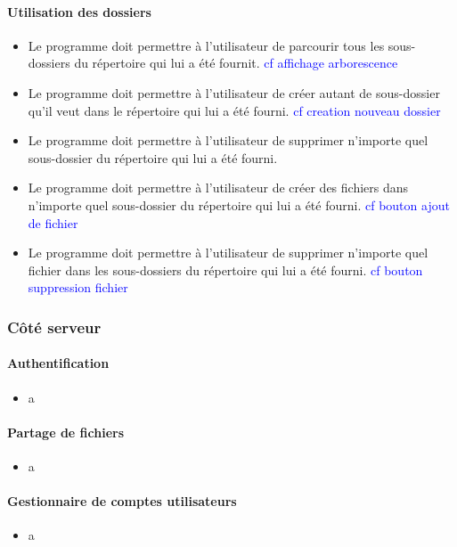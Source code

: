 \documentclass[10pt,a4paper]{report}
\begin{document}
\paragraph{Utilisation des dossiers}
	\begin{itemize}[label = $\triangleright$]
		\item Le programme doit permettre à l'utilisateur de parcourir tous les sous-dossiers du répertoire qui lui a été fournit. \textcolor{blue}{cf affichage arborescence}
		\item Le programme doit permettre à l'utilisateur de créer autant de sous-dossier qu'il veut dans le répertoire qui lui a été fourni. \textcolor{blue}{cf creation nouveau dossier}
		\item Le programme doit permettre à l'utilisateur de supprimer n'importe quel sous-dossier du répertoire qui lui a été fourni.
		\item Le programme doit permettre à l'utilisateur de créer des fichiers dans n'importe quel sous-dossier du répertoire qui lui a été fourni. \textcolor{blue}{cf bouton ajout de fichier}
		\item Le programme doit permettre à l'utilisateur de supprimer n'importe quel fichier dans les sous-dossiers du répertoire qui lui a été fourni. \textcolor{blue}{cf bouton suppression fichier}
	\end{itemize}

\subsubsection{Côté serveur}
\paragraph{Authentification}
	\begin{itemize}[label = $\triangleright$]
		\item a
	\end{itemize}
	
\paragraph{Partage de fichiers}
	\begin{itemize}[label = $\triangleright$]
		\item a
	\end{itemize}
	
\paragraph{Gestionnaire de comptes utilisateurs}
	\begin{itemize}[label = $\triangleright$]
		\item a
	\end{itemize}
\end{document}
